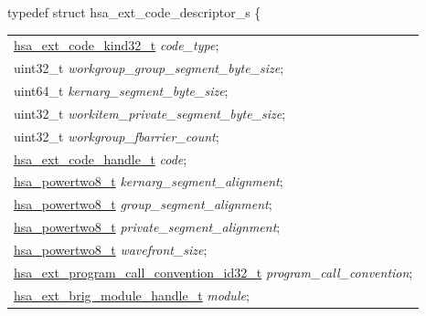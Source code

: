 \documentclass[final]{book}
\newcommand{\reffld}[1]{\textit{#1}}
\begin{document}
\noindent\begin{tcolorbox}[breakable,nobeforeafter,arc=0mm,colframe=white,colback=lightgray,left=0mm]
typedef struct  hsa_ext_code_descriptor_s \{
\vspace{-3.5mm}\begin{longtable}{@{}p{\textwidth}}
\hspace{1.7em}\hyperlink{group__FinalizerCoreApi_1gaeb2b662521c2d1056eec8dfd45fbb960}{hsa_ext_code_kind32_t} \reffld{code_type};\\
\hspace{1.7em}uint32_t \reffld{workgroup_group_segment_byte_size};\\
\hspace{1.7em}uint64_t \reffld{kernarg_segment_byte_size};\\
\hspace{1.7em}uint32_t \reffld{workitem_private_segment_byte_size};\\
\hspace{1.7em}uint32_t \reffld{workgroup_fbarrier_count};\\
\hspace{1.7em}\hyperlink{group__FinalizerCoreApi_1ga5aeece3297b7102d33a2815a368103f7}{hsa_ext_code_handle_t} \reffld{code};\\
\hspace{1.7em}\hyperlink{group__RuntimeCommon_1ga143c7c845aca213614c1d79b65c35a0c}{hsa_powertwo8_t} \reffld{kernarg_segment_alignment};\\
\hspace{1.7em}\hyperlink{group__RuntimeCommon_1ga143c7c845aca213614c1d79b65c35a0c}{hsa_powertwo8_t} \reffld{group_segment_alignment};\\
\hspace{1.7em}\hyperlink{group__RuntimeCommon_1ga143c7c845aca213614c1d79b65c35a0c}{hsa_powertwo8_t} \reffld{private_segment_alignment};\\
\hspace{1.7em}\hyperlink{group__RuntimeCommon_1ga143c7c845aca213614c1d79b65c35a0c}{hsa_powertwo8_t} \reffld{wavefront_size};\\
\hspace{1.7em}\hyperlink{group__FinalizerCoreApi_1gad4afadfa0983f1bc637f3add3a006cba}{hsa_ext_program_call_convention_id32_t} \reffld{program_call_convention};\\
\hspace{1.7em}\hyperlink{group__FinalizerCoreApi_1ga0216996f5341a8591ecf9e0f6fd1b7e5}{hsa_ext_brig_module_handle_t} \reffld{module};\\

\end{longtable}
\end{tcolorbox}
\end{document}
